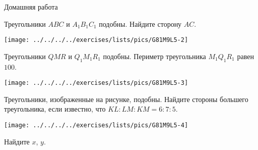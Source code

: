 \begin{homework}[number=3]
	\begin{listofex}
		\item Домашняя работа
	\end{listofex}
\end{homework}

\begin{class}[number=4]
	\begin{listofex}
		\item 
		\begin{minipage}[t]{\bodywidth}
			Треугольники \( ABC \) и \( A_1B_1C_1 \) подобны. Найдите сторону \( AC \).
		\end{minipage}
		\hspace{0.02\linewidth}
		\begin{minipage}[t]{\picwidth}
			\texttt{[image: ../../../../exercises/lists/pics/G81M9L5-2]}
		\end{minipage}
		\item 
		\begin{minipage}[t]{\bodywidth}
			Треугольники \( QMR \) и \( Q_1M_1R_1 \) подобны. Периметр треугольника \(  M_1Q_1R_1 \) равен \( 100 \).
		\end{minipage}
		\hspace{0.02\linewidth}
		\begin{minipage}[t]{\picwidth}
			\texttt{[image: ../../../../exercises/lists/pics/G81M9L5-3]}
		\end{minipage}
		\item 
		\begin{minipage}[t]{\bodywidth}
			Треугольники, изображенные на рисунке, подобны. Найдите стороны большего треугольника, если известно, что \( KL:LM:KM=6:7:5 \).
		\end{minipage}
		\hspace{0.02\linewidth}
		\begin{minipage}[t]{\picwidth}
			\texttt{[image: ../../../../exercises/lists/pics/G81M9L5-4]}
		\end{minipage}
		\item
		\begin{minipage}[t]{\bodywidth}
			Найдите \( x \), \( y \).
		\end{minipage}

\end{listofex}
\end{class}
